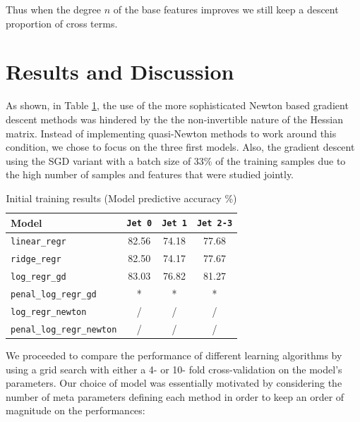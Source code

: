 \documentclass[10pt,conference,compsocconf]{IEEEtran}
\begin{document}
Thus when the degree $n$ of the base features improves we still keep a descent proportion of cross terms.

\section{Results and Discussion}
As shown, in Table \ref{tab_first_run}, the use of the  more sophisticated Newton based  gradient descent methods was hindered by the the non-invertible nature of the Hessian matrix. Instead of implementing quasi-Newton methods to work around this condition, we chose to focus on the three first models. Also, the gradient descent using the SGD variant with a batch size of 33\% of the training samples due to the high number of samples and features that were studied jointly. 
 
\begin{table}[h!]
\centering
\caption{Initial training results (Model predictive accuracy \%)}
\footnotesize
\hspace{-0.2cm}
\begin{tabular}{ l| ccc } 
 \hline
   Model & \verb+Jet 0+& \verb+Jet 1+& \verb+Jet 2-3+ \\
 \hline
   \verb+linear_regr+  & 82.56 &74.18  & 77.68  \\
   \verb+ridge_regr+  & 82.50 & 74.17  & 77.67 \\
   \verb+log_regr_gd+  & 83.03  &  76.82 & 81.27 \\
   \verb+penal_log_regr_gd+  & * & * &  * \\ 
   \verb+log_regr_newton+  & / & / & / \\
   \verb+penal_log_regr_newton+ &  / & / & / \\
  \hline
\end{tabular}
\label{tab_first_run}
\end{table}


We proceeded to compare the performance of different learning algorithms by using a grid search with either a 4- or 10- fold cross-validation on the model's parameters. Our choice of model was essentially motivated by considering the number of meta parameters defining each method in order to keep an order of magnitude on the performances: 
\end{document}

